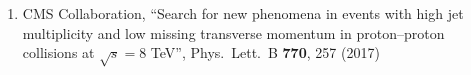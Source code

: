 \begin{enumerate}
\item CMS Collaboration, ``Search for new phenomena in events with high jet multiplicity and low missing transverse momentum in proton–proton collisions at $\sqrt{s}=8$ TeV'', Phys.\ Lett.\ B {\bf 770}, 257 (2017)
  \end{enumerate}
